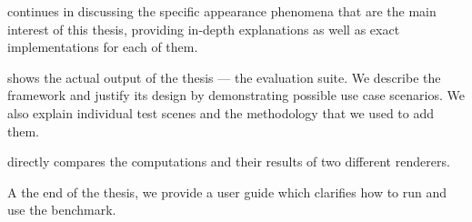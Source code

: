  continues in discussing the specific appearance phenomena that are the main interest of this thesis, providing in-depth explanations as well as exact implementations for each of them. 

 shows the actual output of the thesis --- the evaluation suite. We describe the framework and justify its design by demonstrating possible use case scenarios. We also explain individual test scenes and the methodology that we used to add them.

 directly compares the computations and their results of two different renderers.

A the end of the thesis, we provide a user guide which clarifies how to run and use the benchmark.

